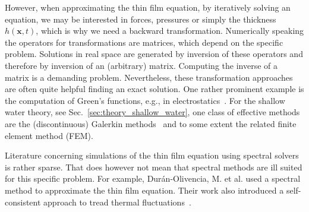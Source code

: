 However, when approximating the thin film equation, by iteratively solving an equation, we may be interested in forces, pressures or simply the thickness $h(\mathbf{x},t)$, which is why we need a backward transformation.
Numerically speaking the operators for transformations are matrices, which depend on the specific problem.
Solutions in real space are generated by inversion of these operators and therefore by inversion of an (arbitrary) matrix.
Computing the inverse of a matrix is a demanding problem. 
Nevertheless, these transformation approaches are often quite helpful finding an exact solution.
One rather prominent example is the computation of Green's functions, e.g., in electrostatics~\cite{greenEssayApplicationMathematical1889}.
For the shallow water theory, see Sec.~\ref{sec:theory_shallow_water}, one class of effective methods are the (discontinuous) Galerkin methods~\cite{ernTheoryPracticeFinite2004} and to some extent the related finite element method (FEM).

Literature concerning simulations of the thin film equation using spectral solvers is rather sparse. 
That does however not mean that spectral methods are ill suited for this specific problem.
For example, Dur{\'a}n-Olivencia, M. et al. used a spectral method to approximate the thin film equation. 
Their work also introduced a self-consistent approach to tread thermal fluctuations~\cite{duran-olivenciaInstabilityRuptureFluctuations2019}.

